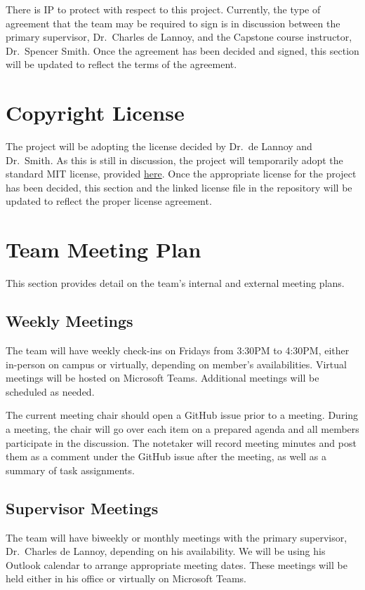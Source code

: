 \documentclass{article}
\begin{document}
There is IP to protect with respect to this project. Currently, the type of
agreement that the team may be required to sign is in discussion between the
primary supervisor, Dr.\ Charles de Lannoy, and the Capstone course instructor,
Dr.\ Spencer Smith. Once the agreement has been decided and signed, this section
will be updated to reflect the terms of the agreement.

\section{Copyright License}

The project will be adopting the license decided by Dr.\ de Lannoy and Dr.\ Smith. As this is
still in discussion, the project will temporarily adopt the standard MIT license, provided
\href{https://github.com/SumanyaG/Alkalytics/blob/main/LICENSE}{here}. Once the appropriate license for the project has been decided, this section and the linked
license file in the repository will be updated to reflect the proper license
agreement.

\section{Team Meeting Plan}
This section provides detail on the team's internal and external meeting plans.
\subsection{Weekly Meetings}
The team will have weekly check-ins on Fridays from 3:30PM to 4:30PM, either in-person 
on campus or virtually, depending on member's availabilities. Virtual meetings 
will be hosted on Microsoft Teams. Additional meetings will be scheduled as needed.\newline

\noindent The current meeting chair should open a GitHub issue prior to a meeting. During a 
meeting, the chair will go over each item on a prepared agenda and all members 
participate in the discussion. The notetaker will record meeting minutes and post 
them as a comment under the GitHub issue after the meeting, as well as a summary of
task assignments.

\subsection{Supervisor Meetings}
The team will have biweekly or monthly meetings with the primary supervisor, Dr.\ Charles
de Lannoy, depending on his availability. We will be using his Outlook calendar to
arrange appropriate meeting dates. These meetings will be held either in his
office or virtually on Microsoft Teams.\newline
\end{document}
